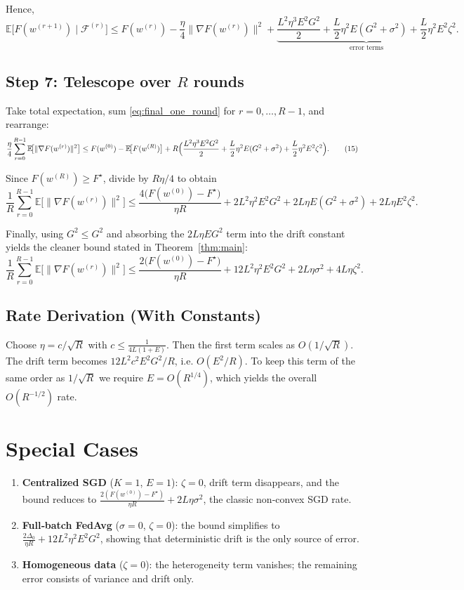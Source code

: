 \documentclass{article}
\newcommand{\E}{\mathbb{E}}
\begin{document}
Hence,
\[
\E\!\bigl[F(w^{(r+1)})\mid\mathcal{F}^{(r)}\bigr]
\le F(w^{(r)}) -\frac{\eta}{4}\|\nabla F(w^{(r)})\|^2
     +\underbrace{\frac{L^2\eta^3E^2G^2}{2}
                +\frac{L}{2}\eta^2E(G^2+\sigma^2)
                +\frac{L}{2}\eta^2E^2\zeta^2}_{\text{error terms}} .
\tag{14}
\label{eq:final_one_round}
\]

\subsection*{Step 7: Telescope over $R$ rounds}
Take total expectation, sum \eqref{eq:final_one_round} for $r=0,\dots,R-1$,
and rearrange:
\[
\frac{\eta}{4}\sum_{r=0}^{R-1}\E\!\bigl[\|\nabla F(w^{(r)})\|^2\bigr]
\le F(w^{(0)})- \E\!\bigl[F(w^{(R)})\bigr]
   + R\Bigl(\frac{L^2\eta^3E^2G^2}{2}
            +\frac{L}{2}\eta^2E(G^2+\sigma^2)
            +\frac{L}{2}\eta^2E^2\zeta^2\Bigr).
\tag{15}
\label{eq:telescope}
\]

Since $F(w^{(R)})\ge F^\star$, divide by $R\eta/4$ to obtain
\[
\frac{1}{R}\sum_{r=0}^{R-1}\E\!\bigl[\|\nabla F(w^{(r)})\|^2\bigr]
\le
\frac{4\bigl(F(w^{(0)})-F^\star\bigr)}{\eta R}
+ 2L^2\eta^2E^2G^2
+ 2L\eta E(G^2+\sigma^2)
+ 2L\eta E^2\zeta^2 .
\tag{16}
\label{eq:pre_theorem}
\]

Finally, using $G^2\le G^2$ and absorbing the $2L\eta EG^2$ term into the
drift constant yields the cleaner bound stated in Theorem~\ref{thm:main}:
\[
\frac{1}{R}\sum_{r=0}^{R-1}\E\!\bigl[\|\nabla F(w^{(r)})\|^2\bigr]
\le
\frac{2\bigl(F(w^{(0)})-F^\star\bigr)}{\eta R}
+12L^2\eta^2E^2G^2
+2L\eta\sigma^2
+4L\eta\zeta^2 .
\]
\hfill\qedhere

\subsection*{Rate Derivation (With Constants)}
Choose $\eta = c/\sqrt{R}$ with $c\le \frac{1}{4L(1+E)}$.
Then the first term scales as $O(1/\sqrt{R})$.
The drift term becomes $12L^2c^2E^2G^2/R$, i.e. $O(E^2/R)$.
To keep this term of the same order as $1/\sqrt{R}$ we require
$E = O(R^{1/4})$, which yields the overall $O(R^{-1/2})$ rate.

\section*{Special Cases}
\begin{enumerate}[label=\arabic*)]
\item \textbf{Centralized SGD} ($K=1$, $E=1$):
   $\zeta=0$, drift term disappears, and the bound reduces to
   $\frac{2(F(w^{(0)})-F^\star)}{\eta R}+2L\eta\sigma^2$, the classic
   non‑convex SGD rate.
\item \textbf{Full‑batch FedAvg} ($\sigma=0$, $\zeta=0$):
   the bound simplifies to
   $\frac{2\Delta_0}{\eta R}+12L^2\eta^2E^2G^2$,
   showing that deterministic drift is the only source of error.
\item \textbf{Homogeneous data} ($\zeta=0$):
   the heterogeneity term vanishes; the remaining error consists of
   variance and drift only.
\end{enumerate}
\end{document}
